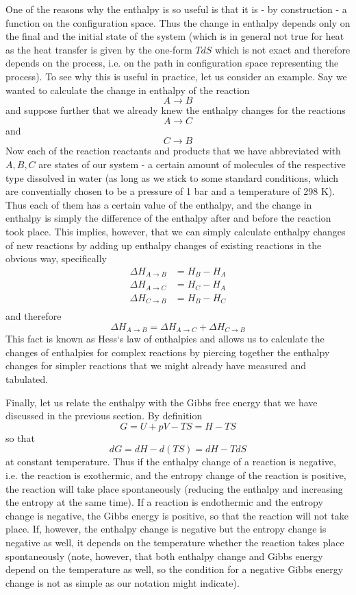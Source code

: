 \documentclass[a4paper, draft]{article}
\theoremstyle{own}
\theoremstyle{remark}
\begin{document}
One of the reasons why the enthalpy is so useful is that it is - by construction - a function on the configuration space. Thus the change in enthalpy depends only on the final and the initial state of the system (which is in general not true for heat as the heat transfer is given by the one-form $T dS$ which is not exact and therefore depends on the process, i.e. on the path in configuration space representing the process). To see why this is useful in practice, let us consider an example. Say we wanted to calculate the change in enthalpy of the reaction 
$$
A \longrightarrow B
$$ 
and suppose further that we already knew the enthalpy changes for the reactions
$$
A \longrightarrow C 
$$
and 
$$
C \longrightarrow B
$$
Now each of the reaction reactants and products that we have abbreviated with $A, B, C$ are states of our system - a certain amount of molecules of the respective type dissolved in water (as long as we stick to some standard conditions, which are conventially chosen to be a pressure of 1 bar and a temperature of 298 K). Thus each of them has a certain value of the enthalpy, and the change in enthalpy is simply the difference of the enthalpy after and before the reaction took place. This implies, however, that we can simply calculate enthalpy changes of new reactions by adding up enthalpy changes of existing reactions in the obvious way, specifically
\begin{align*}
\Delta H_{A \longrightarrow B } &= H_B - H_A \\
\Delta H_{A \longrightarrow C } &= H_C - H_A \\
\Delta H_{C \longrightarrow B } &= H_B - H_C \\
\end{align*}
and therefore
$$
\Delta H_{A \longrightarrow B } = \Delta H_{A \longrightarrow C } + \Delta H_{C \longrightarrow B }
$$
This fact is known as Hess`s law of enthalpies and allows us to calculate the changes of enthalpies for complex reactions by piercing together the enthalpy changes for simpler reactions that we might already have measured and tabulated.

Finally, let us relate the enthalpy with the Gibbs free energy that we have discussed in the previous section. By definition
$$
G = U + pV - TS = H - TS
$$
so that
$$
dG = dH - d(TS) = dH - T dS
$$
at constant temperature. Thus if the enthalpy change of a reaction is negative, i.e. the reaction is exothermic, and the entropy change of the reaction is positive, the reaction will take place spontaneously (reducing the enthalpy and increasing the entropy at the same time). If a reaction is endothermic and the entropy change is negative, the Gibbs energy is positive, so that the reaction will not take place. If, however, the enthalpy change is negative but the entropy change is negative as well, it depends on the temperature whether the reaction takes place spontaneously (note, however, that both enthalpy change and Gibbs energy depend on the temperature as well, so the condition for a negative Gibbs energy change	 is not as simple as our notation might indicate).
\end{document}
